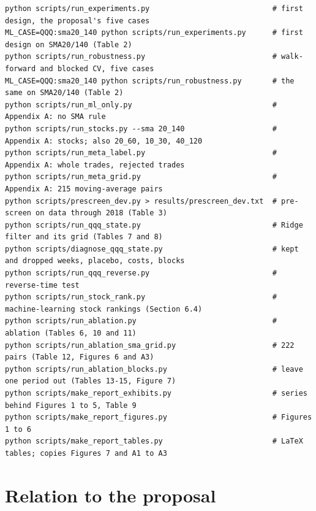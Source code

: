 \documentclass[11pt]{article}
\begin{document}
{\scriptsize
\begin{verbatim}
python scripts/run_experiments.py                            # first design, the proposal's five cases
ML_CASE=QQQ:sma20_140 python scripts/run_experiments.py      # first design on SMA20/140 (Table 2)
python scripts/run_robustness.py                             # walk-forward and blocked CV, five cases
ML_CASE=QQQ:sma20_140 python scripts/run_robustness.py       # the same on SMA20/140 (Table 2)
python scripts/run_ml_only.py                                # Appendix A: no SMA rule
python scripts/run_stocks.py --sma 20_140                    # Appendix A: stocks; also 20_60, 10_30, 40_120
python scripts/run_meta_label.py                             # Appendix A: whole trades, rejected trades
python scripts/run_meta_grid.py                              # Appendix A: 215 moving-average pairs
python scripts/prescreen_dev.py > results/prescreen_dev.txt  # pre-screen on data through 2018 (Table 3)
python scripts/run_qqq_state.py                              # Ridge filter and its grid (Tables 7 and 8)
python scripts/diagnose_qqq_state.py                         # kept and dropped weeks, placebo, costs, blocks
python scripts/run_qqq_reverse.py                            # reverse-time test
python scripts/run_stock_rank.py                             # machine-learning stock rankings (Section 6.4)
python scripts/run_ablation.py                               # ablation (Tables 6, 10 and 11)
python scripts/run_ablation_sma_grid.py                      # 222 pairs (Table 12, Figures 6 and A3)
python scripts/run_ablation_blocks.py                        # leave one period out (Tables 13-15, Figure 7)
python scripts/make_report_exhibits.py                       # series behind Figures 1 to 5, Table 9
python scripts/make_report_figures.py                        # Figures 1 to 6
python scripts/make_report_tables.py                         # LaTeX tables; copies Figures 7 and A1 to A3
\end{verbatim}
}

\section{Relation to the proposal}
\end{document}
